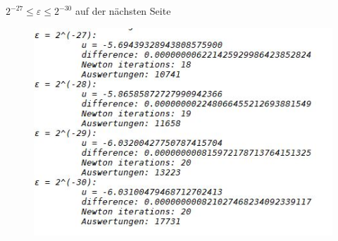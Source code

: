 \documentclass{article}
\begin{document}
		$2^{-27} \leq \varepsilon \leq 2^{-30}$ auf der nächsten Seite
			\begin{figure}
				\includegraphics[scale=0.6]{bpart3.jpg}
			\end{figure}
		\pagebreak
		
\end{document}
